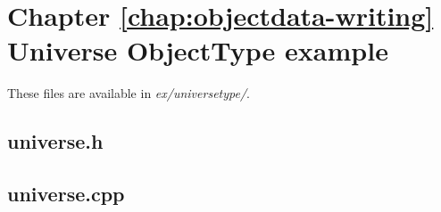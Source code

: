\documentclass[a4paper,11pt]{report}
\newcommand{\filename}[1]{\emph{#1}}
\begin{document}
\chapter{Chapter \ref{chap:objectdata-writing} Universe ObjectType example}
\label{apx:universe_ex}

These files are available in \filename{ex/universetype/}.

\section{universe.h}


\section{universe.cpp}

\end{document}
